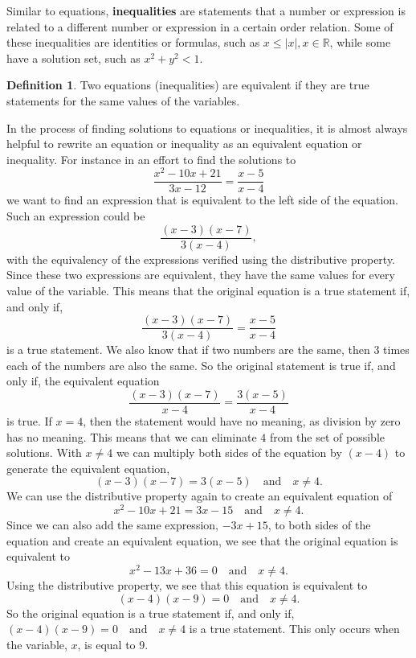 \documentclass[
]{book}
\theoremstyle{definition}
\newtheorem{definition}{Definition}[chapter]
\theoremstyle{definition}
\theoremstyle{definition}
\theoremstyle{definition}
\theoremstyle{remark}
\begin{document}
Similar to equations, \textbf{inequalities} are statements that a number or expression is related to a different number or expression in a certain order relation. Some of these inequalities are identities or formulas, such as \(x\leq |x|, x\in\mathbb{R}\), while some have a solution set, such as \(x^2+y^2<1\).

\begin{definition}
Two equations (inequalities) are equivalent if they are true statements for the same values of the variables.
\end{definition}

In the process of finding solutions to equations or inequalities, it is almost always helpful to rewrite an equation or inequality as an equivalent equation or inequality. For instance in an effort to find the solutions to \[\frac{x^2-10x+21}{3x-12} = \frac{x-5}{x-4}\]
we want to find an expression that is equivalent to the left side of the equation. Such an expression could be \[\frac{(x-3)(x-7)}{3(x-4)},\] with the equivalency of the expressions verified using the distributive property. Since these two expressions are equivalent, they have the same values for every value of the variable. This means that the original equation is a true statement if, and only if, \[\frac{(x-3)(x-7)}{3(x-4)}=\frac{x-5}{x-4}\] is a true statement. We also know that if two numbers are the same, then \(3\) times each of the numbers are also the same. So the original statement is true if, and only if, the equivalent equation
\[\frac{(x-3)(x-7)}{x-4}=\frac{3(x-5)}{x-4}\] is true. If \(x=4\), then the statement would have no meaning, as division by zero has no meaning. This means that we can eliminate \(4\) from the set of possible solutions. With \(x\neq 4\) we can multiply both sides of the equation by \((x-4)\) to generate the equivalent equation, \[(x-3)(x-7)=3(x-5) \quad \mbox{and} \quad x\neq 4.\] We can use the distributive property again to create an equivalent equation of \[x^2-10x+21=3x-15 \quad \mbox{and} \quad x\neq 4.\] Since we can also add the same expression, \(-3x+15\), to both sides of the equation and create an equivalent equation, we see that the original equation is equivalent to \[x^2-13x+36=0 \quad \mbox{and} \quad x\neq 4.\] Using the distributive property, we see that this equation is equivalent to \[(x-4)(x-9)=0 \quad \mbox{and} \quad x\neq 4.\] So the original equation is a true statement if, and only if, \((x-4)(x-9)=0 \quad \mbox{and} \quad x\neq 4\) is a true statement. This only occurs when the variable, \(x\), is equal to \(9\).
\end{document}
